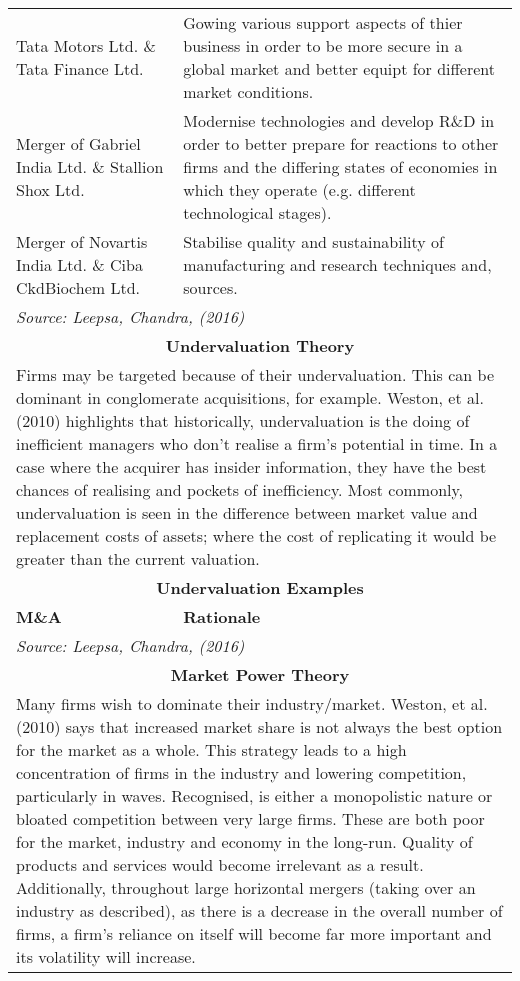 \documentclass[11pt, english]{article}
\begin{document}
\begin{center}
\begin{longtable}{p{5cm}p{7.5cm}}
        \hline
        Tata Motors Ltd. \& Tata Finance Ltd. & Gowing various support aspects of thier business in order to be more secure in a global market and better equipt for different market conditions.\\
        Merger of Gabriel India Ltd. \& Stallion Shox Ltd. & Modernise technologies and develop R\&D in order to better prepare for reactions to other firms and the differing states of economies in which they operate (e.g. different technological stages).\\
        Merger of Novartis India Ltd. \& Ciba CkdBiochem Ltd. & Stabilise quality and sustainability of manufacturing and research techniques and, sources.\\
        \hline
        \multicolumn{2}{p{13cm}}{\textit{Source: Leepsa, Chandra, (2016)}}\\
        \hline
        \hline
        \multicolumn{2}{c}{\textbf{Undervaluation Theory}}\\
        \hline
        \hline
        \multicolumn{2}{p{13cm}}{Firms may be targeted because of their undervaluation. This can be dominant in conglomerate acquisitions, for example. Weston, et al. (2010) highlights that historically, undervaluation is the doing of inefficient managers who don't realise a firm's potential in time. In a case where the acquirer has insider information, they have the best chances of realising and pockets of inefficiency. Most commonly, undervaluation is seen in the difference between market value and replacement costs of assets; where the cost of replicating it would be greater than the current valuation.}\\
        \hline
        \multicolumn{2}{c}{\textbf{Undervaluation Examples}}\\
        \hline
        \textbf{M\&A} & \textbf{Rationale}\\ 
        \hline
        \hline
        \multicolumn{2}{p{13cm}}{\textit{Source: Leepsa, Chandra, (2016)}}\\
        \hline
        \hline
        \multicolumn{2}{c}{\textbf{Market Power Theory}}\\        
        \hline
        \hline
	\multicolumn{2}{p{13cm}}{Many firms wish to dominate their industry/market. Weston, et al. (2010) says that increased market share is not always the best option for the market as a whole. This strategy leads to a high concentration of firms in the industry and lowering competition, particularly in waves. Recognised, is either a monopolistic nature or bloated competition between very large firms. These are both poor for the market, industry and economy in the long-run. Quality of products and services would become irrelevant as a result. Additionally, throughout large horizontal mergers (taking over an industry as described), as there is a decrease in the overall number of firms, a firm's reliance on itself will become far more important and its volatility will increase.}\\

\end{longtable}
\end{center}
\end{document}
